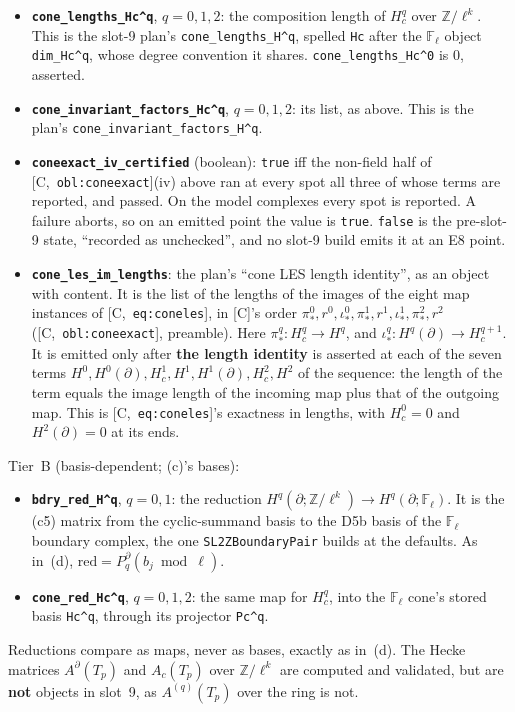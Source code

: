 \documentclass[11pt]{article}
\theoremstyle{remark}
\newcommand{\F}{\mathbb{F}}
\newcommand{\Z}{\mathbb{Z}}
\newcommand{\Fl}{\F_\ell}
\DeclareMathOperator{\rank}{rank}
\newcommand{\HA}[1]{[C,~\texttt{#1}]}      %
\begin{document}
\begin{itemize}
  zero, so $\dim H^0(\partial;\Fl)-\rank\beta^0_{\partial}$ counts a free class as well, and
  would misname it.
\item \textbf{\texttt{cone\_lengths\_Hc\textasciicircum q}}, $q=0,1,2$: the composition length of
  $H^q_c$ over $\Z/\ell^k$. This is the slot-9 plan's \texttt{cone\_lengths\_H\textasciicircum q},
  spelled \texttt{Hc} after the $\Fl$ object \texttt{dim\_Hc\textasciicircum q}, whose degree
  convention it shares. \texttt{cone\_lengths\_Hc\textasciicircum0} is $0$, asserted.
\item \textbf{\texttt{cone\_invariant\_factors\_Hc\textasciicircum q}}, $q=0,1,2$: its list, as
  above. This is the plan's \texttt{cone\_invariant\_factors\_H\textasciicircum q}.
\item \textbf{\texttt{coneexact\_iv\_certified}} (boolean): \texttt{true} iff the non-field half
  of \HA{obl:coneexact}(iv) above ran at every spot all three of whose terms are reported, and
  passed. On the model complexes every spot is reported. A failure aborts, so on an emitted point
  the value is \texttt{true}. \texttt{false} is the pre-slot-9 state, ``recorded as unchecked'',
  and no slot-9 build emits it at an E8 point.
\item \textbf{\texttt{cone\_les\_im\_lengths}}: the plan's ``cone LES length identity'', as an
  object with content. It is the list of the lengths of the images of the eight map instances of
  \HA{eq:coneles}, in [C]'s order
  $\pi^0_{\ast},r^0,\iota^0_{\ast},\pi^1_{\ast},r^1,\iota^1_{\ast},\pi^2_{\ast},r^2$
  (\HA{obl:coneexact}, preamble). Here $\pi^q_{\ast}\colon H^q_c\to H^q$, and
  $\iota^q_{\ast}\colon H^q(\partial)\to H^{q+1}_c$. It is emitted only after \textbf{the length
  identity} is asserted at each of the seven terms
  $H^0,H^0(\partial),H^1_c,H^1,H^1(\partial),H^2_c,H^2$ of the sequence: the length of the term
  equals the image length of the incoming map plus that of the outgoing map. This is
  \HA{eq:coneles}'s exactness in lengths, with $H^0_c=0$ and $H^2(\partial)=0$ at its ends.
\end{itemize}
Tier~B (basis-dependent; (c)'s bases):
\begin{itemize}
\item \textbf{\texttt{bdry\_red\_H\textasciicircum q}}, $q=0,1$: the reduction
  $H^q(\partial;\Z/\ell^k)\to H^q(\partial;\Fl)$. It is the (c5) matrix from the cyclic-summand
  basis to the D5b basis of the $\Fl$ boundary complex, the one \texttt{SL2ZBoundaryPair} builds
  at the defaults. As in~(d), $\mathrm{red}=P^{\partial}_q(b_j\bmod\ell)$.
\item \textbf{\texttt{cone\_red\_Hc\textasciicircum q}}, $q=0,1,2$: the same map for $H^q_c$, into
  the $\Fl$ cone's stored basis \texttt{Hc\textasciicircum q}, through its projector
  \texttt{Pc\textasciicircum q}.
\end{itemize}
Reductions compare as maps, never as bases, exactly as in~(d). The Hecke matrices
$A^{\partial}(T_p)$ and $A_c(T_p)$ over $\Z/\ell^k$ are computed and validated, but are
\textbf{not} objects in slot~9, as $A^{(q)}(T_p)$ over the ring is not.
\end{document}

